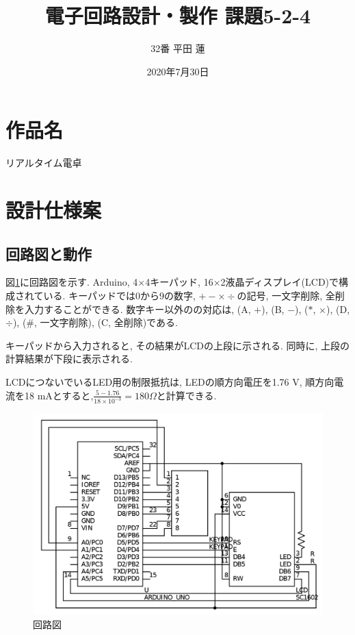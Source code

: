 \documentclass[]{jsarticle}
\title{電子回路設計・製作 課題5-2-4}
\author{32番 平田 蓮}
\date{2020年7月30日}
\begin{document}
\maketitle
\section{作品名}
    リアルタイム電卓

\section{設計仕様案}
    \subsection{回路図と動作}
        図\ref{fig:circuit}に回路図を示す.
        Arduino, 4$\times$4キーパッド, 16$\times$2液晶ディスプレイ(LCD)で構成されている.
        キーパッドでは0から9の数字, $+ - \times \div$の記号, 一文字削除, 全削除を入力することができる.
        数字キー以外のの対応は,
        (A, $+$), (B, $-$), ($*$, $\times$), (D, $\div$), (\#, 一文字削除), (C, 全削除)である.

        キーパッドから入力されると, その結果がLCDの上段に示される.
        同時に, 上段の計算結果が下段に表示される.

        LCDにつないでいるLED用の制限抵抗は, LEDの順方向電圧を1.76 V,
        順方向電流を18 mAとすると,$\displaystyle\frac{5 - 1.76}{18 \times 10^{-3}} = 180 \Omega$と計算できる.

        \begin{figure}[h]
            \centering
            \includegraphics[width=12cm]{images/circuit.png}
            \caption{回路図}
            \label{fig:circuit}
        \end{figure}
\end{document}
